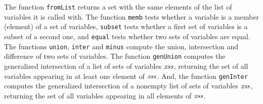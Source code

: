 The function \texttt{fromList} returns a set with the same elements of
the list of variables it is called with.  The function \texttt{memb}
tests whether a variable is a member (element) of a set of variables,
\texttt{subset} tests whether a first set of variables is a subset of a
second one, and \texttt{equal} tests whether two sets of variables are
equal.  The functions \texttt{union}, \texttt{inter} and
\texttt{minus} compute the union, intersection and difference of two
sets of variables.  The function \texttt{genUnion} computes the
generalized intersection of a list of sets of variables ${\it xss}$,
returning the set of all variables appearing in at least one element of
${\it xss}$.  And, the function \texttt{genInter} computes the generalized
intersection of a nonempty list of sets of variables ${\it xss}$, returning
the set of all variables appearing in all elements of ${\it xss}$.

